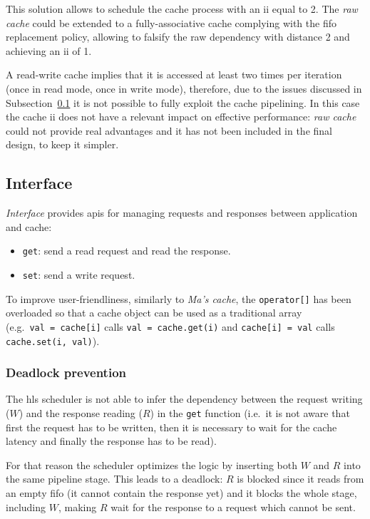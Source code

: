 \documentclass[11pt,a4paper,oneside]{memoir}
\begin{document}
\bigskip
This solution allows to schedule the cache process with an \ac{ii} equal to 2.
The \emph{\ac{raw} cache} could be extended to a fully-associative cache
complying with the \ac{fifo} replacement policy, allowing to falsify the
\ac{raw} dependency with distance 2 and achieving an \ac{ii} of 1.

\bigskip
A read-write cache implies that it is accessed at least two times per iteration
(once in read mode, once in write mode), therefore, due to the issues discussed
in Subsection~\ref{subsec:basic_impl_if} it is not possible to fully exploit the
cache pipelining.
In this case the cache \ac{ii} does not have a relevant impact on effective
performance: \emph{\ac{raw} cache} could not provide real advantages and it has
not been included in the final design, to keep it simpler.

\subsection{Interface}\label{subsec:basic_impl_if}
\emph{Interface} provides \acsp{api} for managing requests and responses between
application and cache:
\begin{itemize}
	\item \texttt{get}: send a read request and read the response.
	\item \texttt{set}: send a write request.
\end{itemize}
To improve user-friendliness, similarly to \emph{Ma's cache}, the
\texttt{operator[]} has been overloaded so that a cache object can be used as a
traditional array (e.g.\ \texttt{val~=~cache[i]} calls
\texttt{val~=~cache.get(i)} and \texttt{cache[i]~=~val} calls
\texttt{cache.set(i,~val)}).

\subsubsection{Deadlock prevention}
The \ac{hls} scheduler is not able to infer the dependency between the request
writing ($W$) and the response reading ($R$) in the \texttt{get} function
(i.e.\ it is not aware that first the request has to be written, then it is
necessary to wait for the cache latency and finally the response has to be
read).

For that reason the scheduler optimizes the logic by inserting both $W$ and $R$
into the same pipeline stage.
This leads to a deadlock: $R$ is blocked since it reads from an empty \ac{fifo}
(it cannot contain the response yet) and it blocks the whole stage, including
$W$, making $R$ wait for the response to a request which cannot be sent.
\end{document}
